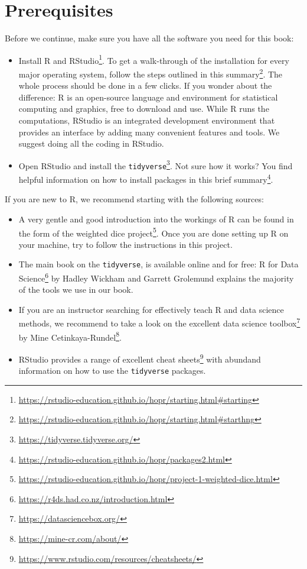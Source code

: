 \documentclass[
]{krantz}
\providecommand{\tightlist}{%
  \setlength{\itemsep}{0pt}\setlength{\parskip}{0pt}}
\renewcommand{\href}[2]{#2\footnote{\url{#1}}}
\begin{document}
\hypertarget{prerequisites}{%
\section*{Prerequisites}\label{prerequisites}}


Before we continue, make sure you have all the software you need for this book:

\begin{itemize}
\tightlist
\item
  \href{https://rstudio-education.github.io/hopr/starting.html\#starting}{Install R and RStudio}. To get a walk-through of the installation for every major operating system, follow the steps outlined \href{https://rstudio-education.github.io/hopr/starting.html\#starthng}{in this summary}. The whole process should be done in a few clicks. If you wonder about the difference: R is an open-source language and environment for statistical computing and graphics, free to download and use. While R runs the computations, RStudio is an integrated development environment that provides an interface by adding many convenient features and tools. We suggest doing all the coding in RStudio.
\item
  Open RStudio and \href{https://tidyverse.tidyverse.org/}{install the \texttt{tidyverse}}. Not sure how it works? You find helpful information on how to install packages in this \href{https://rstudio-education.github.io/hopr/packages2.html}{brief summary}.
\end{itemize}

If you are new to R, we recommend starting with the following sources:

\begin{itemize}
\tightlist
\item
  A very gentle and good introduction into the workings of R can be found in the form of the \href{https://rstudio-education.github.io/hopr/project-1-weighted-dice.html}{weighted dice project}. Once you are done setting up R on your machine, try to follow the instructions in this project.
\item
  The main book on the \texttt{tidyverse}, \citet{Wickham2016} is available online and for free: \href{https://r4ds.had.co.nz/introduction.html}{R for Data Science} by Hadley Wickham and Garrett Grolemund explains the majority of the tools we use in our book.
\item
  If you are an instructor searching for effectively teach R and data science methods, we recommend to take a look on the excellent \href{https://datasciencebox.org/}{data science toolbox} by \href{https://mine-cr.com/about/}{Mine Cetinkaya-Rundel}.
\item
  RStudio provides a range of excellent \href{https://www.rstudio.com/resources/cheatsheets/}{cheat sheets} with abundand information on how to use the \texttt{tidyverse} packages.
\end{itemize}
\end{document}
